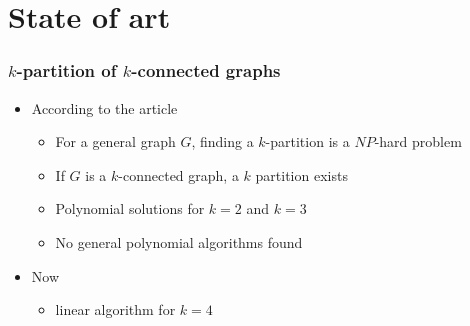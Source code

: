 \section{State of art}
%

\begin{frame}
  \frametitle{$k$-partition of $k$-connected graphs}
  \begin{itemize}
  \item According to the article
    \begin{itemize}
    \item For a general graph $G$, finding a $k$-partition is a $NP$-hard
      problem\cite{Dyer1985139}
    \item If $G$ is a $k$-connected graph, a $k$ partition exists\cite{GE78,LL77}
    \item Polynomial solutions for $k = 2$\cite{GE78,LL77} and
      $k = 3$%
    \item No general polynomial algorithms found
    \end{itemize}
  \item Now
    \begin{itemize}
    \item linear algorithm for $k = 4$\cite{Nakano1997315}
    \end{itemize}
  \end{itemize}
\end{frame}

